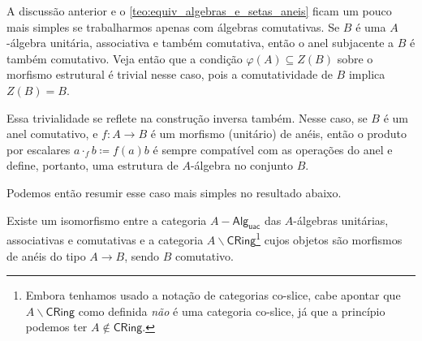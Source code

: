 \begin{obs}
  A discussão anterior e o \cref{teo:equiv_algebras_e_setas_aneis} ficam um pouco mais simples se trabalharmos apenas com álgebras comutativas.
  Se $B$ é uma $A$-álgebra unitária, associativa e também comutativa, então o anel subjacente a $B$ é também comutativo.
  Veja então que a condição $\varphi(A) \subseteq Z(B)$ sobre o morfismo estrutural é trivial nesse caso, pois a comutatividade de $B$ implica $Z(B) = B$.

  Essa trivialidade se reflete na construção inversa também.
  Nesse caso, se $B$ é um anel comutativo, e $f: A \to B$ é um morfismo (unitário) de anéis, então o produto por escalares $ a \cdot_{f} b \coloneqq f(a)b$ é sempre compatível com as operações do anel e define, portanto, uma estrutura de $A$-álgebra no conjunto $B$.

  Podemos então resumir esse caso mais simples no resultado abaixo.

  \begin{teo}
    Existe um isomorfismo entre a categoria $A-\mathsf{Alg_{uac}}$ das $A$-álgebras unitárias, associativas e comutativas e a categoria $A \backslash \mathsf{CRing}$\footnote{Embora tenhamos usado a notação de categorias co-slice, cabe apontar que $A \backslash \mathsf{CRing}$ como definida \emph{não} é uma categoria co-slice, já que a princípio podemos ter $A \not\in \mathsf{CRing}$.} cujos objetos são morfismos de anéis do tipo $A \to B$, sendo $B$ comutativo.
  \end{teo}
\end{obs}





